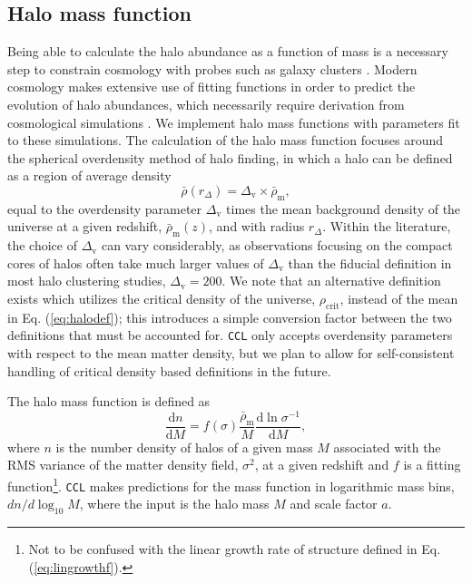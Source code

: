 \documentclass[\docopts]{\docclass}
\newcommand{\ccl}{{\tt CCL}\xspace}
\begin{document}
\subsection{Halo mass function}
\label{sec:hmfdef}

Being able to calculate the halo abundance as a function of mass is a necessary step to constrain cosmology with probes such as galaxy clusters \citep{Paranjape2014}. Modern cosmology makes extensive use of fitting functions in order to predict the evolution of halo abundances, which necessarily require derivation from cosmological simulations \citep{Tinker2008, Tinker2010, Angulo2012}. We implement halo mass functions with parameters fit to these simulations. The calculation of the halo mass function focuses around the spherical overdensity method of halo finding, in which a halo can be defined as a region of average density
\begin{equation}
  \bar{\rho}(r_{\Delta}) = \Delta_\mathrm{v} \times \bar{\rho}_{\mathrm{m}},
  \label{eq:halodef}
\end{equation}
%
equal to the overdensity parameter $\Delta_\mathrm{v}$ times the mean background density of the universe at a given redshift, $\bar\rho_{\mathrm{m}}(z)$, and with radius $r_{\Delta}$. Within the literature, the choice of $\Delta_\mathrm{v}$ can vary considerably, as observations focusing on the compact cores of halos often take much larger values of $\Delta_\mathrm{v}$ than the fiducial definition in most halo clustering studies, $\Delta_\mathrm{v} = 200$. We note that an alternative definition exists which utilizes the critical density of the universe, $\rho_{\mathrm{crit}}$, instead of the mean in Eq. (\ref{eq:halodef}); this introduces a simple conversion factor between the two definitions that must be accounted for. \ccl only accepts overdensity parameters with respect to the mean matter density, but we plan to allow for self-consistent handling of critical density based definitions in the future. 

The halo mass function is defined as
\begin{equation}
\frac{\mathrm{d}n}{\mathrm{d}M}=f(\sigma)\frac{\bar{\rho}_\mathrm{m}}{M}\frac{\mathrm{d}\ln{\sigma^{-1}}}{\mathrm{d}M},
\label{eq:halo_mass_function}
\end{equation}
where $n$ is the number density of halos of a given mass $M$ associated with the RMS variance of the matter density field, $\sigma^2$, at a given redshift and $f$ is a fitting function\footnote{Not to be confused with the linear growth rate of structure defined in Eq. (\ref{eq:lingrowthf}).}. \ccl makes predictions for the mass function in logarithmic mass bins, $dn/d\log_{10}{M}$, where the input is the halo mass $M$ and scale factor $a$.
\end{document}
